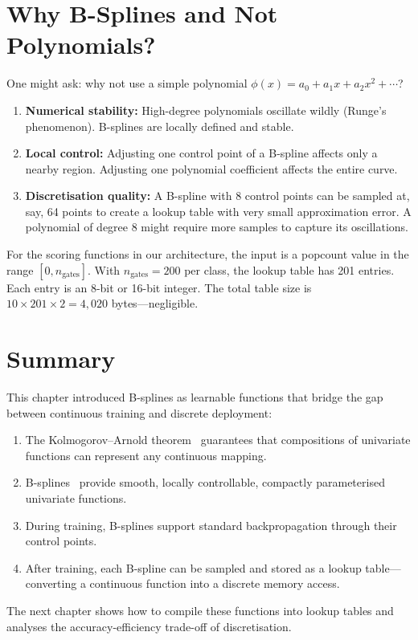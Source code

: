 \section{Why B-Splines and Not Polynomials?}
\label{sec:why-splines}

One might ask: why not use a simple polynomial $\phi(x) = a_0 +
a_1 x + a_2 x^2 + \cdots$?

\begin{enumerate}
  \item \textbf{Numerical stability:} High-degree polynomials
    oscillate wildly (Runge's phenomenon). B-splines are locally
    defined and stable.
  \item \textbf{Local control:} Adjusting one control point of a
    B-spline affects only a nearby region. Adjusting one polynomial
    coefficient affects the entire curve.
  \item \textbf{Discretisation quality:} A B-spline with 8 control
    points can be sampled at, say, 64 points to create a lookup table
    with very small approximation error. A polynomial of degree 8
    might require more samples to capture its oscillations.
\end{enumerate}

\begin{engineernote}
For the scoring functions in our architecture, the input is a
popcount value in the range $[0, n_{\text{gates}}]$. With $n_{\text{gates}} = 200$
per class, the lookup table has 201 entries. Each entry is an 8-bit
or 16-bit integer. The total table size is $10 \times 201 \times 2 =
4{,}020$ bytes---negligible.
\end{engineernote}


\section{Summary}
\label{sec:ch10-summary}

This chapter introduced B-splines as learnable functions that bridge
the gap between continuous training and discrete deployment:

\begin{enumerate}
  \item The Kolmogorov--Arnold theorem~\cite{kolmogorov1957representation} guarantees that compositions
    of univariate functions can represent any continuous mapping.
  \item B-splines~\cite{deboor1978splines} provide smooth, locally controllable, compactly
    parameterised univariate functions.
  \item During training, B-splines support standard backpropagation
    through their control points.
  \item After training, each B-spline can be sampled and stored as a
    lookup table---converting a continuous function into a discrete
    memory access.
\end{enumerate}

The next chapter shows how to compile these functions into lookup
tables and analyses the accuracy-efficiency trade-off of
discretisation.
